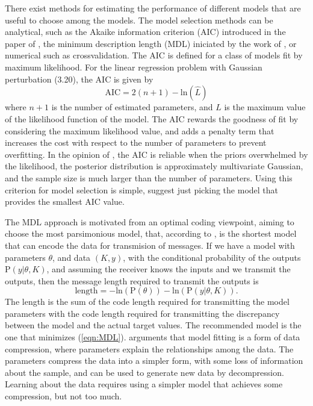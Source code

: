 \documentclass[11pt]{article}
\begin{document}
\begin{itemize}
	There exist methods for estimating the performance of different models that are useful to choose among the models.
	The model selection methods can be analytical, such as the Akaike information criterion (AIC) introduced in the paper of \cite{Akaike74}, the minimum description length (MDL) iniciated by the work of \cite{Rissanen78}, or numerical such as crossvalidation.
	The AIC is defined for a class of models fit by maximum likelihood. 
	For the linear regression problem with Gaussian perturbation (3.20), the AIC is given by
	\begin{equation} \tag{5.9} \mathrm{AIC} = 2 \left( n+1 \right) - \mathrm{ln} \left( \widehat{L} \right) \label{eqn:AIC} \end{equation}
	where $n+1$ is the number of estimated parameters, and $\widehat{L}$ is the maximum value of the likelihood function of the model.
	The AIC rewards the goodness of fit by considering the maximum likelihood value, and adds a penalty term that increases the cost with respect to the number of parameters to prevent overfitting.
	In the opinion of \cite{McElreath20}, the AIC is reliable when the priors overwhelmed by the likelihood, the posterior distribution is approximately multivariate Gaussian, and the sample size is much larger than the number of parameters.
	Using this criterion for model selection is simple, \cite{Hastie09} suggest just picking the model that provides the smallest AIC value.

	The MDL approach is motivated from an optimal coding viewpoint, aiming to choose the most parsimonious model, that, according to \cite{Hastie09}, is the shortest model that can encode the data for transmision of messages.
	If we have a model with parameters $\theta$, and data $(K, y)$, with the conditional probability of the outputs $\mathrm{P}(y | \theta, K)$, and assuming the receiver knows the inputs and we transmit the outputs, then the message length required to transmit the outputs is
    \begin{equation} \tag{5.10} \mathrm{length} = - \mathrm{ln} \left( \mathrm{P}( \theta ) \right) - \mathrm{ln} \left( \mathrm{P}(y | \theta, K) \right) . \label{eqn:MDL} \end{equation}
    The length is the sum of the code length required for transmitting the model parameters with the code length required for transmitting the discrepancy between the model and the actual target values. 
    The recommended model is the one that minimizes (\ref{eqn:MDL}).
	\cite{McElreath20} arguments that model fitting is a form of data compression, where parameters explain the relationships among the data. 
	The parameters compress the data into a simpler form, with some loss of information about the sample, and 
	can be used to generate new data by decompression.
	Learning about the data requires using a simpler model that achieves some compression, but not too much.
    \color{black}


\end{itemize}
\end{document}

